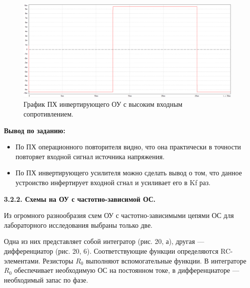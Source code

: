 \documentclass[a4paper,14pt]{extarticle}
\begin{document}
    \begin{figure}[h!]
        \begin{center}
            \includegraphics[scale=0.25]{17.png}
        \end{center}
        \vspace{-0.7cm}
        \caption{График ПХ инвертирующего ОУ с высоким входным сопротивлением.}
    \end{figure}

    \textbf{Вывод по заданию:}

    \begin{itemize}
        \item По ПХ операционного повторителя видно, что она практически в точности повторяет входной сигнал источника напряжения.
        \item По ПХ инвертирующего усилителя можно сделать вывод о том, что данное устроиство инфертирует входной сгнал и усиливает его в Kf раз.
    \end{itemize}


    \begin{center}
        \textbf{3.2.2. Схемы на ОУ с частотно-зависимой ОС.}
    \end{center}

    Из огромного разнообразия схем ОУ с частотно-зависимыми цепями ОС для 
    лабораторного исследования выбраны только две.

    Одна из них представляет собой интегратор (рис. 20, а), 
    другая — дифференциатор (рис. 20, 6). Соответствующие функции 
    определяются RC-элементами. Резисторы $R_0$ выполняют вспомогательные 
    функции. В интеграторе $R_0$ обеспечивает необходимую ОС на постоянном 
    токе, в дифференциаторе — необходимый запас по фазе.
\end{document}
